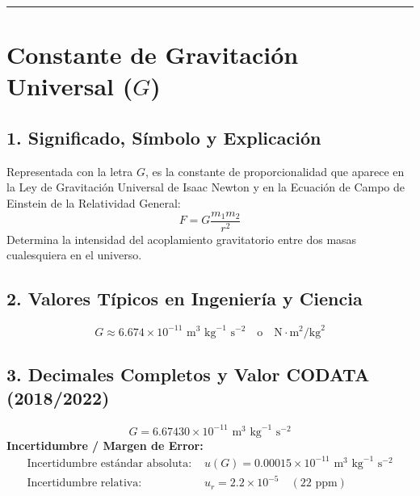 \documentclass[12pt,a4paper]{article}
\begin{document}
\vspace{0.8cm}
\hrule
\vspace{0.8cm}

\section{Constante de Gravitación Universal ($G$)}

\subsection*{1. Significado, Símbolo y Explicación}
Representada con la letra $G$, es la constante de proporcionalidad que aparece en la Ley de Gravitación Universal de Isaac Newton y en la Ecuación de Campo de Einstein de la Relatividad General:
\begin{equation*}
F = G \frac{m_1 m_2}{r^2}
\end{equation*}
Determina la intensidad del acoplamiento gravitatorio entre dos masas cualesquiera en el universo.

\subsection*{2. Valores Típicos en Ingeniería y Ciencia}
\begin{equation*}
G \approx 6.674 \times 10^{-11} \text{ m}^3 \text{ kg}^{-1} \text{ s}^{-2} \quad \text{o} \quad \text{N}\cdot\text{m}^2/\text{kg}^2
\end{equation*}

\subsection*{3. Decimales Completos y Valor CODATA (2018/2022)}
\begin{equation*}
G = 6.67430 \times 10^{-11} \text{ m}^3 \text{ kg}^{-1} \text{ s}^{-2}
\end{equation*}
\textbf{Incertidumbre / Margen de Error:}
\begin{align*}
\text{Incertidumbre estándar absoluta: } & u(G) = 0.00015 \times 10^{-11} \text{ m}^3 \text{ kg}^{-1} \text{ s}^{-2} \\
\text{Incertidumbre relativa: } & u_r = 2.2 \times 10^{-5} \quad (22 \text{ ppm})
\end{align*}
\end{document}
